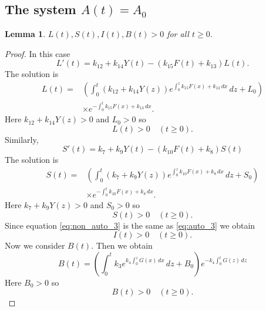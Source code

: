 \documentclass[pdflatex,sn-mathphys-num]{sn-jnl}
\theoremstyle{thmstyleone}
\newtheorem{lemma}{Lemma}[section]
\theoremstyle{thmstyletwo}
\theoremstyle{thmstylethree}
\begin{document}
\subsection{\texorpdfstring{The system $A(t)=A_0$}{The system A(t)=A0}}

\begin{lemma}
    $L(t), S(t), I(t), B(t)>0$ for all $t\geq 0$.
\end{lemma}
\begin{proof}
    In this case 
\begin{equation}
L'(t)=k_{12}+k_{14}Y(t)-(k_{15}F(t)+k_{13})L(t).
\end{equation}
The solution is
\begin{align}
L(t) = & \left(\int_0^t \left( k_{12} + k_{14}Y(z) \right) 
e^{\int_0^z k_{15}F(x)+k_{13} \, dx} \, dz +L_0 \right) \nonumber \\
   &\times e^{-\int_0^t k_{15}F(x)+k_{13} \, dx}. \label{eq:L gen exp sol A0}
\end{align}
Here $k_{12}+k_{14}Y(z)>0$ and $L_0>0$ so 
\begin{equation}
    L(t)>0\quad (t\geq 0).
\end{equation}
Similarly, 
\begin{equation}
S'(t)=k_7+k_9 Y(t)-(k_{10}F(t)+k_8)S(t)
\end{equation}
The solution is
\begin{align}
S(t) = & \left(\int_0^t \left( k_{7} + k_{9}Y(z) \right) 
e^{\int_0^z k_{10}F(x)+k_{8} \, dx} \, dz +S_0 \right) \nonumber \\
   &\times e^{-\int_0^t k_{10}F(x)+k_{8} \, dx}. \label{eq:S gen exp sol A0}
\end{align}
Here $k_{7}+k_{9}Y(z)>0$ and $S_0>0$ so 
\begin{equation}
    S(t)>0\quad (t\geq 0).
\end{equation}
Since equation \eqref{eq:non_auto_3} is the same as \eqref{eq:auto_3} we obtain
\begin{equation}
   I(t)>0\quad (t\geq 0).
\end{equation}
Now we consider $B(t)$. 
Then we obtain
\begin{equation}\label{eq:B gen exp sol A0}
B(t)=\left(
\int_0^t k_3 e^{k_4 \int_0^z G(x)\,dx}
\,dz+
B_0
\right)e^{-k_4 \int_0^t G(z)\,dz}
\end{equation}
Here $B_0>0$ so
\begin{equation}
   B(t)>0\quad (t\geq 0).
\end{equation}
\end{proof}
\end{document}
